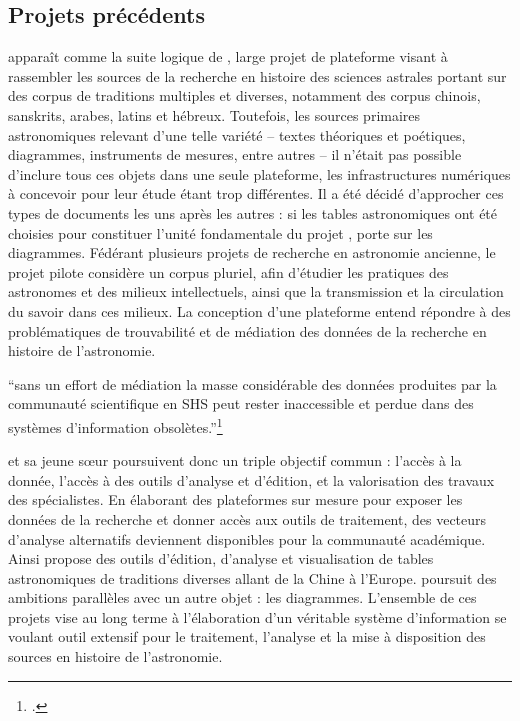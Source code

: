 \hypertarget{projets-precedents}{%
\subsection{Projets précédents}\label{projets-precedents}}

\eida apparaît comme la suite logique de \dishas, large projet de
plateforme visant à rassembler les sources de la recherche en histoire
des sciences astrales portant sur des corpus de traditions multiples et
diverses, notamment des corpus chinois, sanskrits, arabes, latins et
hébreux. Toutefois, les sources primaires astronomiques relevant d'une
telle variété -- textes théoriques et poétiques, diagrammes, instruments
de mesures, entre autres -- il n'était pas possible d'inclure tous ces
objets dans une seule plateforme, les infrastructures numériques à
concevoir pour leur étude étant trop différentes. Il a été décidé
d'approcher ces types de documents les uns après les autres : si les
tables astronomiques ont été choisies pour constituer l'unité
fondamentale du projet \dishas, \eida porte sur les diagrammes. Fédérant
plusieurs projets de recherche en astronomie ancienne, le projet pilote
\dishas considère un corpus pluriel, afin d'étudier les pratiques des
astronomes et des milieux intellectuels, ainsi que la transmission et la
circulation du savoir dans ces milieux. La conception d'une plateforme
entend répondre à des problématiques de trouvabilité et de médiation des
données de la recherche en histoire de l'astronomie.

\begin{kwote}
``sans un effort de médiation la masse considérable des données
produites par la communauté scientifique en SHS peut rester inaccessible
et perdue dans des systèmes d'information obsolètes.''\footcite[p.xix]{albouy_mediation_2019}
\end{kwote}       

\dishas et sa jeune sœur \eida poursuivent donc un triple objectif commun
: l'accès à la donnée, l'accès à des outils d'analyse et d'édition, et
la valorisation des travaux des spécialistes. En élaborant des
plateformes sur mesure pour exposer les données de la recherche et
donner accès aux outils de traitement, des vecteurs d'analyse
alternatifs deviennent disponibles pour la communauté académique. Ainsi
\dishas propose des outils d'édition, d'analyse et visualisation de
tables astronomiques de traditions diverses allant de la Chine à
l'Europe. \eida poursuit des ambitions parallèles avec un autre objet :
les diagrammes. L'ensemble de ces projets vise au long terme à
l'élaboration d'un véritable système d'information se voulant outil
extensif pour le traitement, l'analyse et la mise à disposition des
sources en histoire de l'astronomie.

